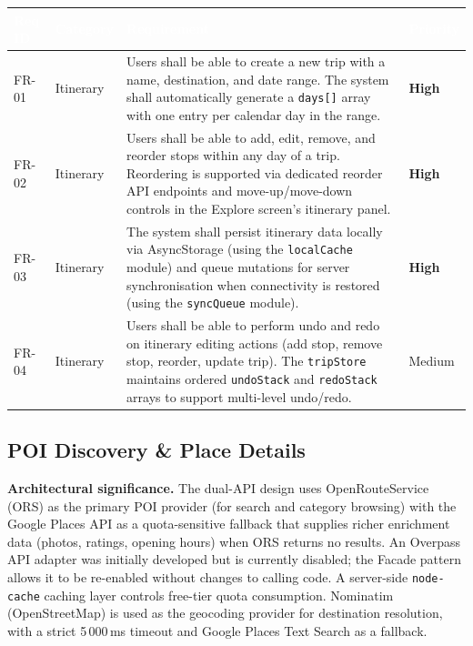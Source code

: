 \documentclass[12pt, a4paper]{article}
\newcommand{\reqid}[1]{\textsc{\small #1}}
\newcommand{\high}{\textbf{High}}
\newcommand{\medium}{Medium}
\newcommand{\thcell}[1]{\textcolor{white}{\textbf{\small #1}}}
\begin{document}
\vspace{0.4em}
\begin{longtable}{C{1.6cm} C{2.0cm} L{8.2cm} C{1.8cm}}
\toprule
{}
\thcell{Req ID} & \thcell{Category} & \thcell{Requirement} & \thcell{Priority} \\
\midrule
\endhead
\bottomrule
\endfoot

\reqid{FR-01} & Itinerary &
Users shall be able to create a new trip with a name, destination, and date range. The system shall automatically generate a \texttt{days[]} array with one entry per calendar day in the range. &
\high \\

\reqid{FR-02} & Itinerary &
Users shall be able to add, edit, remove, and reorder stops within any day of a trip. Reordering is supported via dedicated reorder API endpoints and move-up/move-down controls in the Explore screen's itinerary panel. &
\high \\

\reqid{FR-03} & Itinerary &
The system shall persist itinerary data locally via AsyncStorage (using the \texttt{localCache} module) and queue mutations for server synchronisation when connectivity is restored (using the \texttt{syncQueue} module). &
\high \\

\reqid{FR-04} & Itinerary &
Users shall be able to perform undo and redo on itinerary editing actions (add stop, remove stop, reorder, update trip). The \texttt{tripStore} maintains ordered \texttt{undoStack} and \texttt{redoStack} arrays to support multi-level undo/redo. &
\medium \\

\end{longtable}

\subsection{POI Discovery \& Place Details}

\begin{tcolorbox}[notebox]
  \textbf{Architectural significance.} The dual-API design uses OpenRouteService (ORS) as the primary POI provider (for search and category browsing) with the Google Places API as a quota-sensitive fallback that supplies richer enrichment data (photos, ratings, opening hours) when ORS returns no results. An Overpass API adapter was initially developed but is currently disabled; the Facade pattern allows it to be re-enabled without changes to calling code. A server-side \texttt{node-cache} caching layer controls free-tier quota consumption. Nominatim (OpenStreetMap) is used as the geocoding provider for destination resolution, with a strict 5\,000\,ms timeout and Google Places Text Search as a fallback.
\end{tcolorbox}
\end{document}
